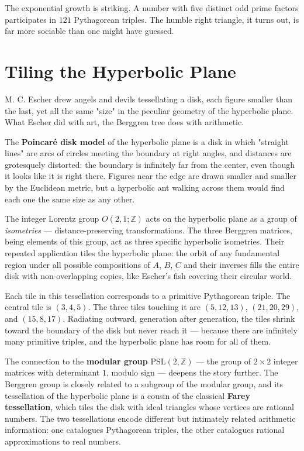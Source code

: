 \documentclass[11pt,twoside,openright]{book}
\theoremstyle{definition}
\theoremstyle{remark}
\begin{document}
The exponential growth is striking. A number with five distinct odd prime factors participates in $121$ Pythagorean triples. The humble right triangle, it turns out, is far more sociable than one might have guessed.



\section{Tiling the Hyperbolic Plane}

M. C. Escher drew angels and devils tessellating a disk, each figure smaller than the last, yet all the same "size" in the peculiar geometry of the hyperbolic plane. What Escher did with art, the Berggren tree does with arithmetic.

The \textbf{Poincar\'e disk model} of the hyperbolic plane is a disk in which "straight lines" are arcs of circles meeting the boundary at right angles, and distances are grotesquely distorted: the boundary is infinitely far from the center, even though it looks like it is right there. Figures near the edge are drawn smaller and smaller by the Euclidean metric, but a hyperbolic ant walking across them would find each one the same size as any other.

The integer Lorentz group $O(2,1; \mathbb{Z})$ acts on the hyperbolic plane as a group of \textit{isometries} --- distance-preserving transformations. The three Berggren matrices, being elements of this group, act as three specific hyperbolic isometries. Their repeated application tiles the hyperbolic plane: the orbit of any fundamental region under all possible compositions of $A$, $B$, $C$ and their inverses fills the entire disk with non-overlapping copies, like Escher's fish covering their circular world.

Each tile in this tessellation corresponds to a primitive Pythagorean triple. The central tile is $(3, 4, 5)$. The three tiles touching it are $(5, 12, 13)$, $(21, 20, 29)$, and $(15, 8, 17)$. Radiating outward, generation after generation, the tiles shrink toward the boundary of the disk but never reach it --- because there are infinitely many primitive triples, and the hyperbolic plane has room for all of them.

The connection to the \textbf{modular group} $\text{PSL}(2, \mathbb{Z})$ --- the group of $2 \times 2$ integer matrices with determinant $1$, modulo sign --- deepens the story further. The Berggren group is closely related to a subgroup of the modular group, and its tessellation of the hyperbolic plane is a cousin of the classical \textbf{Farey tessellation}, which tiles the disk with ideal triangles whose vertices are rational numbers. The two tessellations encode different but intimately related arithmetic information: one catalogues Pythagorean triples, the other catalogues rational approximations to real numbers.
\end{document}
